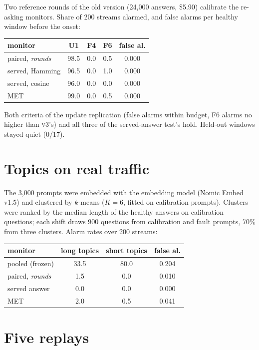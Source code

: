 \documentclass{article}
\newcommand{\vthree}{\textsc{v3}}
\begin{document}
Two reference rounds of the old version (24{,}000 answers, \$5.90) calibrate the
re-asking monitors. Share of 200 streams alarmed, and false alarms per healthy
window before the onset:

\begin{center}\small
\begin{tabular}{lcccc}
  \toprule
  monitor & U1 & F4 & F6 & false al. \\
  \midrule
  paired, \emph{rounds} & 98.5 & 0.0 & 0.5 & 0.000 \\
  served, Hamming & 96.5 & 0.0 & 1.0 & 0.000 \\
  served, cosine & 96.0 & 0.0 & 0.0 & 0.000 \\
  MET & 99.0 & 0.0 & 0.5 & 0.000 \\
  \bottomrule
\end{tabular}
\end{center}

\noindent Both criteria of the update replication (false alarms within budget, F6
alarms no higher than \vthree{}'s) and all three of the served-answer test's hold.
Held-out windows stayed quiet (0/17).

\section{Topics on real traffic}
\label{app:topics}

The 3{,}000 prompts were embedded with the embedding model (Nomic Embed v1.5) and clustered by $k$-means
($K=6$, fitted on calibration prompts). Clusters were ranked by the median length of
the healthy answers on calibration questions; each shift draws 900 questions from
calibration and fault prompts, 70\% from three clusters. Alarm rates over 200
streams:

\begin{center}\small
\begin{tabular}{lccc}
  \toprule
  monitor & long topics & short topics & false al. \\
  \midrule
  pooled (frozen) & 33.5 & 80.0 & 0.204 \\
  paired, \emph{rounds} & 1.5 & 0.0 & 0.010 \\
  served answer & 0.0 & 0.0 & 0.000 \\
  MET & 2.0 & 0.5 & 0.041 \\
  \bottomrule
\end{tabular}
\end{center}

\section{Five replays}
\label{app:replays}
\end{document}
